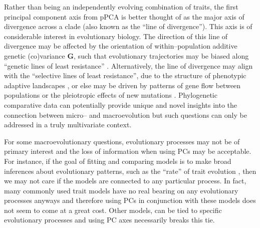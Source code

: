 \documentclass[a4paper,12pt]{article}
\begin{document}
Rather than being an independently evolving combination of traits, the first principal component axis from pPCA is better thought of as the major axis of divergence across a clade (also known as the ``line of divergence''). This axis is of considerable interest in evolutionary biology. The direction of this line of divergence may be affected by the orientation of within--population additive genetic (co)variance $\mathbf{G}$, such that evolutionary trajectories may be biased along ``genetic lines of least resistance'' \citep[i.e., divergence occurs primarily along the leading eigenvector of $\mathbf{G}$, $G_{\text{max}}$;][]{Schluter1996}. Alternatively, the line of divergence may align with the ``selective lines of least resistance'', due to the structure of phenotypic adaptive landscapes \citep{Jonesetal2007, Arnoldetal2008}, or else may be driven by patterns of gene flow between populations \citep{Guillaume2007} or the pleiotropic effects of new mutations \citep{Jonesetal2007, Hether2013}. Phylogenetic comparative data can potentially provide unique and novel insights into the connection between micro-- and macroevolution \citep{Hohenlohe2008} but such questions can only be addressed in a truly multivariate context. 


For some macroevolutionary questions, evolutionary processes may not be of primary interest and the loss of information when using PCs may be acceptable. For instance, if the goal of fitting and comparing models is to make broad inferences about evolutionary patterns, such as the ``rate'' of trait evolution \citep{Hunt2012}, then we may not care if the models are connected to any particular process. In fact, many commonly used trait models \citep[such as the $\lambda, \delta, \text{and} \kappa$ tree transformations;][]{Pagel1997, Pagel1999} have no real bearing on any evolutionary processes anyways \citep{HansenOrzack2005} and therefore using PCs in conjunction with these models does not seem to come at a great cost. Other models, can be tied to specific evolutionary processes \citep{HansenMartins1996, EstesArnold2007, Hansen2008, Hansen2012SysBio, PennellHarmon, PennellPE} and using PC axes necessarily breaks this tie.
\end{document}

